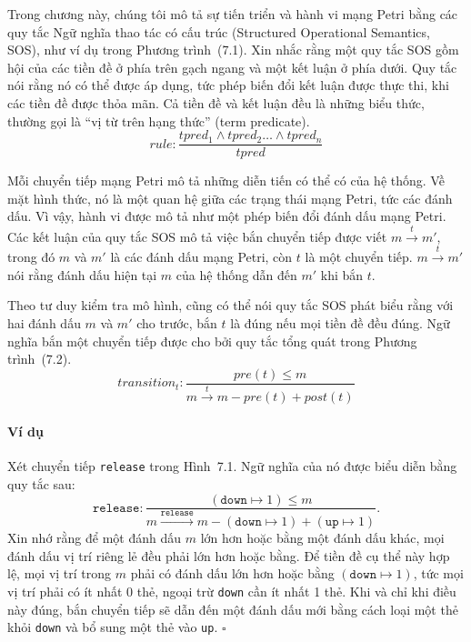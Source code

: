 Trong chương này, chúng tôi mô tả sự tiến triển và hành vi mạng Petri bằng các quy tắc Ngữ nghĩa thao tác có cấu trúc (Structured Operational Semantics, SOS), như ví dụ trong Phương trình~(7.1). Xin nhắc rằng một quy tắc SOS gồm hội của các tiền đề ở phía trên gạch ngang và một kết luận ở phía dưới. Quy tắc nói rằng nó có thể được áp dụng, tức phép biến đổi kết luận được thực thi, khi các tiền đề được thỏa mãn. Cả tiền đề và kết luận đều là những biểu thức, thường gọi là ``vị từ trên hạng thức'' (term predicate).
\begin{equation}
rule:\frac{tpred_1\land tpred_2\ldots\land tpred_n}{tpred}\tag{7.1}
\end{equation}

Mỗi chuyển tiếp mạng Petri mô tả những diễn tiến có thể có của hệ thống. Về mặt hình thức, nó là một quan hệ giữa các trạng thái mạng Petri, tức các đánh dấu. Vì vậy, hành vi được mô tả như một phép biến đổi đánh dấu mạng Petri. Các
kết luận của quy tắc SOS mô tả việc bắn chuyển tiếp được viết $m\xrightarrow{t}m'$, trong đó $m$ và $m'$ là các đánh dấu mạng Petri, còn $t$ là một chuyển tiếp. $m\xrightarrow{t}m'$ nói rằng đánh dấu hiện tại $m$ của hệ thống dẫn đến $m'$ khi bắn $t$.

Theo tư duy kiểm tra mô hình, cũng có thể nói quy tắc SOS phát biểu rằng với hai đánh dấu $m$ và $m'$ cho trước, bắn $t$ là đúng nếu mọi tiền đề đều đúng. Ngữ nghĩa bắn một chuyển tiếp được cho bởi quy tắc tổng quát trong Phương trình~(7.2).
\begin{equation}
transition_t:\frac{pre(t)\leqslant m}{m\xrightarrow{t}m-pre(t)+post(t)}\tag{7.2}
\end{equation}

\paragraph{Ví dụ}
Xét chuyển tiếp \texttt{release} trong Hình~7.1. Ngữ nghĩa của nó được biểu diễn bằng quy tắc sau:
\[
\texttt{release}:\frac{(\texttt{down}\mapsto1)\leqslant m}{m\xrightarrow{\texttt{release}}m-(\texttt{down}\mapsto1)+(\texttt{up}\mapsto1)}.
\]
Xin nhớ rằng để một đánh dấu $m$ lớn hơn hoặc bằng một đánh dấu khác, mọi đánh dấu vị trí riêng lẻ đều phải lớn hơn hoặc bằng. Để tiền đề cụ thể này hợp lệ, mọi vị trí trong $m$ phải có đánh dấu lớn hơn hoặc bằng $(\texttt{down}\mapsto1)$, tức mọi vị trí phải có ít nhất 0 thẻ, ngoại trừ \texttt{down} cần ít nhất 1 thẻ. Khi và chỉ khi điều này đúng, bắn chuyển tiếp sẽ dẫn đến một đánh dấu mới bằng cách loại một thẻ khỏi \texttt{down} và bổ sung một thẻ vào \texttt{up}. $\square$

